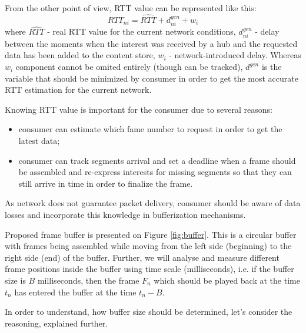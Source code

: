 \documentclass[10pt]{proc}
\begin{document}
From the other point of view, RTT value can be represented like this:
\begin{equation}
RTT_{ni} = \widehat{RTT} + d^{gen}_{ni} + w_i
\end{equation}
where $\widehat{RTT}$ - real RTT value for the current network conditions, $d^{gen}_{ni}$ - delay between the moments when the interest was received by a hub and the requested data has been added to the content store, $w_i$ - network-introduced delay.
Whereas $w_i$ component cannot be omited entirely (though can be tracked), $d^{gen}$ is the variable that should be minimized by consumer in order to get the most accurate RTT estimation for the current network. 

Knowing RTT value is important for the consumer due to several reasons:

\begin{itemize}
\item consumer can estimate which fame number to request in order to get the latest data;
\item consumer can track segments arrival and set a deadline when a frame should be assembled and re-express interests for missing segments so that they can still arrive in time in order to finalize the frame.
\end{itemize} 

As network does not guarantee packet delivery, consumer should be aware of data losses and incorporate this knowledge in bufferization mechanisms. 

Proposed frame buffer is presented on Figure \ref{fig:buffer}. This is a circular buffer with frames being assembled while moving from the left side (beginning) to the right side (end) of the buffer. Further, we will analyse and measure different frame positions inside the buffer using time scale (milliseconds), i.e. if the buffer size is $B$ milliseconds, then the frame $F_n$ which should be played back at the time $t_n$ has entered the buffer at the time $t_n-B$.

In order to understand, how buffer size should be determined, let's consider the reasoning, explained further.
\end{document}
